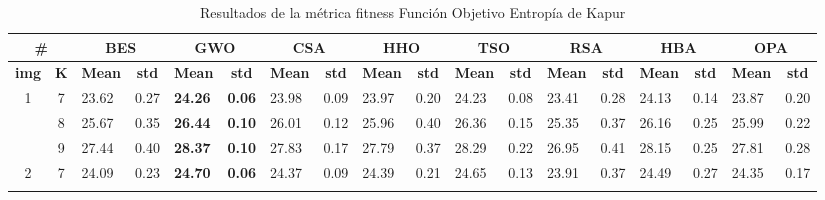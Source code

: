 \documentclass[conference]{IEEEtran}
\begin{document}
\begin{table}[]
	\caption{Resultados de la métrica fitness Función Objetivo Entropía de Kapur}
	\begin{tabular}{|cc|ll|ll|ll|ll|ll|ll|ll|ll|}
		\hline
		\multicolumn{2}{|c|}{\textbf{\#}} & \multicolumn{2}{c|}{\textbf{BES}} & \multicolumn{2}{c|}{\textbf{GWO}} & \multicolumn{2}{c|}{\textbf{CSA}} & \multicolumn{2}{c|}{\textbf{HHO}} & \multicolumn{2}{c|}{\textbf{TSO}} & \multicolumn{2}{c|}{\textbf{RSA}} & \multicolumn{2}{c|}{\textbf{HBA}} & \multicolumn{2}{c|}{\textbf{OPA}} \\ \hline
		\multicolumn{1}{|c|}{\textbf{img}} & \textbf{K} & \multicolumn{1}{c|}{\textbf{Mean}} & \multicolumn{1}{c|}{\textbf{std}} & \multicolumn{1}{c|}{\textbf{Mean}} & \multicolumn{1}{c|}{\textbf{std}} & \multicolumn{1}{c|}{\textbf{Mean}} & \multicolumn{1}{c|}{\textbf{std}} & \multicolumn{1}{c|}{\textbf{Mean}} & \multicolumn{1}{c|}{\textbf{std}} & \multicolumn{1}{c|}{\textbf{Mean}} & \multicolumn{1}{c|}{\textbf{std}} & \multicolumn{1}{c|}{\textbf{Mean}} & \multicolumn{1}{c|}{\textbf{std}} & \multicolumn{1}{c|}{\textbf{Mean}} & \multicolumn{1}{c|}{\textbf{std}} & \multicolumn{1}{c|}{\textbf{Mean}} & \multicolumn{1}{c|}{\textbf{std}} \\ \hline
		\multicolumn{1}{|c|}{\multirow{3}{*}{1}} & 7 & \multicolumn{1}{l|}{23.62} & 0.27 & \multicolumn{1}{l|}{\textbf{24.26}} & \textbf{0.06} & \multicolumn{1}{l|}{23.98} & 0.09 & \multicolumn{1}{l|}{23.97} & 0.20 & \multicolumn{1}{l|}{24.23} & 0.08 & \multicolumn{1}{l|}{23.41} & 0.28 & \multicolumn{1}{l|}{24.13} & 0.14 & \multicolumn{1}{l|}{23.87} & 0.20 \\ \cline{2-18} 
		\multicolumn{1}{|c|}{} & 8 & \multicolumn{1}{l|}{25.67} & 0.35 & \multicolumn{1}{l|}{\textbf{26.44}} & \textbf{0.10} & \multicolumn{1}{l|}{26.01} & 0.12 & \multicolumn{1}{l|}{25.96} & 0.40 & \multicolumn{1}{l|}{26.36} & 0.15 & \multicolumn{1}{l|}{25.35} & 0.37 & \multicolumn{1}{l|}{26.16} & 0.25 & \multicolumn{1}{l|}{25.99} & 0.22 \\ \cline{2-18} 
		\multicolumn{1}{|c|}{} & 9 & \multicolumn{1}{l|}{27.44} & 0.40 & \multicolumn{1}{l|}{\textbf{28.37}} & \textbf{0.10} & \multicolumn{1}{l|}{27.83} & 0.17 & \multicolumn{1}{l|}{27.79} & 0.37 & \multicolumn{1}{l|}{28.29} & 0.22 & \multicolumn{1}{l|}{26.95} & 0.41 & \multicolumn{1}{l|}{28.15} & 0.25 & \multicolumn{1}{l|}{27.81} & 0.28 \\ \hline
		\multicolumn{1}{|c|}{\multirow{3}{*}{2}} & 7 & \multicolumn{1}{l|}{24.09} & 0.23 & \multicolumn{1}{l|}{\textbf{24.70}} & \textbf{0.06} & \multicolumn{1}{l|}{24.37} & 0.09 & \multicolumn{1}{l|}{24.39} & 0.21 & \multicolumn{1}{l|}{24.65} & 0.13 & \multicolumn{1}{l|}{23.91} & 0.37 & \multicolumn{1}{l|}{24.49} & 0.27 & \multicolumn{1}{l|}{24.35} & 0.17 \\ \cline{2-18} 

\end{tabular}
\end{table}
\end{document}
